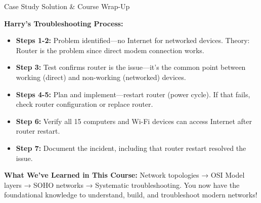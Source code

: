 \documentclass[aspectratio=169]{beamer}
\begin{document}
\begin{frame}{Case Study Solution \& Course Wrap-Up}

\textbf{Harry's Troubleshooting Process:}
\begin{itemize}
    \item \textbf{Steps 1-2:} Problem identified—no Internet for networked devices. Theory: Router is the problem since direct modem connection works.
    \item \textbf{Step 3:} Test confirms router is the issue—it's the common point between working (direct) and non-working (networked) devices.
    \item \textbf{Steps 4-5:} Plan and implement—restart router (power cycle). If that fails, check router configuration or replace router.
    \item \textbf{Step 6:} Verify all 15 computers and Wi-Fi devices can access Internet after router restart.
    \item \textbf{Step 7:} Document the incident, including that router restart resolved the issue.
\end{itemize}

\vspace{0.2cm}

\textbf{What We've Learned in This Course:}
Network topologies → OSI Model layers → SOHO networks → Systematic troubleshooting. You now have the foundational knowledge to understand, build, and troubleshoot modern networks!

\end{frame}
\end{document}
